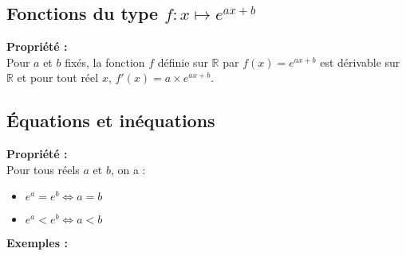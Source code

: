 \documentclass[11pt,a4paper]{article}
\begin{document}
\subsection{Fonctions du type $f:x\mapsto e^{ax+b}$}

\begin{mdframed}[style=proprieteStyle]
    \textbf{Propriété :} ~\\
    Pour $a$ et $b$ fixés, la fonction $f$ définie sur $\mathbb{R}$ par $f(x)=e^{ax+b}$ est dérivable sur $\mathbb{R}$ et pour tout réel $x$, $f'(x)=a\times e^{ax+b}$.
\end{mdframed}


\subsection{Équations et inéquations}

\begin{mdframed}[style=proprieteStyle]
    \textbf{Propriété :} ~\\
    Pour tous réels $a$ et $b$, on a :
    \vspace{-4pt}
    \begin{itemize}
        \item $e^a=e^b \Leftrightarrow a=b$
        \item $e^a<e^b \Leftrightarrow a<b$
    \end{itemize}
\end{mdframed}

\newpage

\textbf{Exemples :} ~\\
\end{document}
